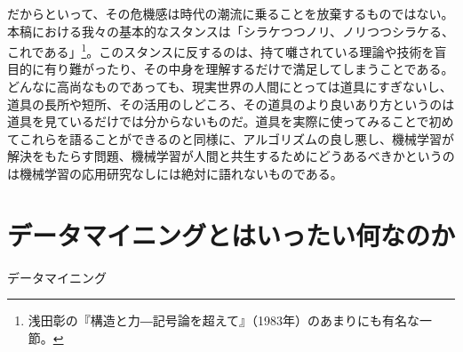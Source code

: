 だからといって、その危機感は時代の潮流に乗ることを放棄するものではない。本稿における我々の基本的なスタンスは「シラケつつノリ、ノリつつシラケる、これである」\footnote{浅田彰の『構造と力―記号論を超えて』（1983年）のあまりにも有名な一節。}。このスタンスに反するのは、持て囃されている理論や技術を盲目的に有り難がったり、その中身を理解するだけで満足してしまうことである。どんなに高尚なものであっても、現実世界の人間にとっては道具にすぎないし、道具の長所や短所、その活用のしどころ、その道具のより良いあり方というのは道具を見ているだけでは分からないものだ。道具を実際に使ってみることで初めてこれらを語ることができるのと同様に、アルゴリズムの良し悪し、機械学習が解決をもたらす問題、機械学習が人間と共生するためにどうあるべきかというのは機械学習の応用研究なしには絶対に語れないものである。

\section{データマイニングとはいったい何なのか}
データマイニング
